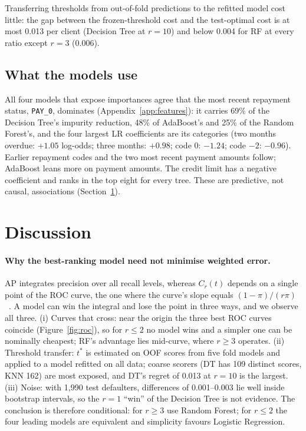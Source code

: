 \documentclass{article}
\begin{document}
Transferring thresholds from out-of-fold predictions to the refitted model cost little: the gap between the frozen-threshold cost and the test-optimal cost is at most 0.013 per client (Decision Tree at $r=10$) and below 0.004 for RF at every ratio except $r=3$ (0.006).

\subsection{What the models use}
All four models that expose importances agree that the most recent repayment status, \texttt{PAY\_0}, dominates (Appendix~\ref{app:features}): it carries 69\% of the Decision Tree's impurity reduction, 48\% of AdaBoost's and 25\% of the Random Forest's, and the four largest LR coefficients are its categories (two months overdue: $+1.05$ log-odds; three months: $+0.98$; code 0: $-1.24$; code $-2$: $-0.96$). Earlier repayment codes and the two most recent payment amounts follow; AdaBoost leans more on payment amounts. The credit limit has a negative coefficient and ranks in the top eight for every tree. These are predictive, not causal, associations (Section~\ref{sec:discussion}).

\section{Discussion}
\label{sec:discussion}
\paragraph{Why the best-ranking model need not minimise weighted error.} AP integrates precision over all recall levels, whereas $C_r(t)$ depends on a single point of the ROC curve, the one where the curve's slope equals $(1-\pi)/(r\pi)$~\citep{provost2001robust}. A model can win the integral and lose the point in three ways, and we observe all three. (i) Curves that cross: near the origin the three best ROC curves coincide (Figure~\ref{fig:roc}), so for $r\le2$ no model wins and a simpler one can be nominally cheapest; RF's advantage lies mid-curve, where $r\ge3$ operates. (ii) Threshold transfer: $t^\ast$ is estimated on OOF scores from five fold models and applied to a model refitted on all data; coarse scorers (DT has 109 distinct scores, KNN 162) are most exposed, and DT's regret of 0.013 at $r=10$ is the largest. (iii) Noise: with 1{,}990 test defaulters, differences of 0.001--0.003 lie well inside bootstrap intervals, so the $r=1$ ``win'' of the Decision Tree is not evidence. The conclusion is therefore conditional: for $r\ge3$ use Random Forest; for $r\le2$ the four leading models are equivalent and simplicity favours Logistic Regression.
\end{document}
